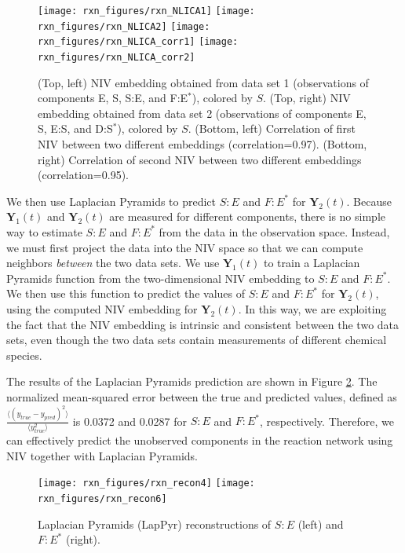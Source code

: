 \documentclass[aip,jcp,reprint,twocolumn]{revtex4-1}
\begin{document}
\begin{figure}[ht]
    \texttt{[image: rxn\_figures/rxn\_NLICA1]}
    \texttt{[image: rxn\_figures/rxn\_NLICA2]}
    \texttt{[image: rxn\_figures/rxn\_NLICA\_corr1]}
    \texttt{[image: rxn\_figures/rxn\_NLICA\_corr2]}
    \caption{(Top, left) NIV embedding obtained from data set 1 (observations of components E, S, S:E, and F:E$^{*}$), colored by $S$. (Top, right) NIV embedding obtained from data set 2 (observations of components E, S, E:S, and D:S$^{*}$), colored by $S$. (Bottom, left) Correlation of first NIV between two different embeddings (correlation=0.97). (Bottom, right)  Correlation of second NIV between two different embeddings (correlation=0.95).}
    \label{fig:rxn_embedding}
\end{figure}

We then use Laplacian Pyramids to predict $S:E$ and $F:E^{*}$ for $\mathbf{Y}_2(t)$.
%
Because $\mathbf{Y}_1(t)$ and $\mathbf{Y}_2(t)$ are measured for different components, there is no simple way to estimate $S:E$ and $F:E^{*}$ from the data in the observation space.
%
Instead, we must first project the data into the NIV space so that we can compute neighbors {\em between} the two data sets.
%
We use $\mathbf{Y}_1(t)$ to train a Laplacian Pyramids function from the two-dimensional NIV embedding to $S:E$ and $F:E^{*}$.
%
We then use this function to predict the values  of $S:E$ and $F:E^{*}$ for $\mathbf{Y}_2(t)$, using the computed NIV embedding for $\mathbf{Y}_2(t)$.
%
In this way, we are exploiting the fact that the NIV embedding is intrinsic and consistent between the two data sets, even though the two data sets contain measurements of different chemical species.

The results of the Laplacian Pyramids prediction are shown in Figure \ref{fig:rxn_recon}.
%
The normalized mean-squared error between the true and predicted values, defined as $\frac{\langle (y_{true}-y_{pred})^2 \rangle}{\langle y_{true}^2 \rangle}$ is 0.0372 and 0.0287 for $S:E$ and $F:E^{*}$, respectively.
%
Therefore, we can effectively predict the unobserved components in the reaction network using NIV together with Laplacian Pyramids.

\begin{figure}[ht]
    \texttt{[image: rxn\_figures/rxn\_recon4]}
    \texttt{[image: rxn\_figures/rxn\_recon6]}
    \caption{Laplacian Pyramids (LapPyr) reconstructions of $S:E$ (left) and $F:E^{*}$ (right).}
    \label{fig:rxn_recon}
\end{figure}
\end{document}

